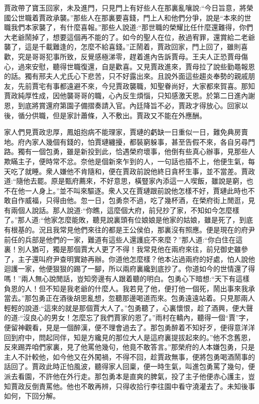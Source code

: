 \begin{parag}
    賈政帶了寶玉回家，未及進門，只見門上有好些人在那裏亂嚷說:“今日旨意，將榮國公世職着賈政承襲。”那些人在那裏要喜錢，門上人和他們分爭，說是“本來的世職我們本家襲了，有什麼喜報。”那些人說道:“那世職的榮耀比任什麼還難得，你們大老爺鬧掉了，想要這個再不能的了。如今的聖人在位，赦過宥罪，還賞給二老爺襲了，這是千載難逢的，怎麼不給喜錢。”正鬧着，賈政回家，門上回了，雖則喜歡，究是哥哥犯事所致，反覺感極涕零，趕着進內告訴賈母。王夫人正恐賈母傷心，過來安慰，聽得世職復還，自是歡喜。又見賈政進來，賈母拉了說些勤黽報恩的話。獨有邢夫人尤氏心下悲苦，只不好露出來。且說外面這些趨炎奉勢的親戚朋友，先前賈宅有事都遠避不來，今兒賈政襲職，知聖眷尚好，大家都來賀喜。那知賈政純厚性成，因他襲哥哥的職，心內反生煩惱，只知感激天恩。於第二日進內謝恩，到底將賞還府第園子備摺奏請入官。內廷降旨不必，賈政才得放心。回家以後，循分供職，但是家計蕭條，入不敷出。賈政又不能在外應酬。
\end{parag}


\begin{parag}
    家人們見賈政忠厚，鳳姐抱病不能理家，賈璉的虧缺一日重似一日，難免典房賣地。府內家人幾個有錢的，怕賈璉纏擾，都裝窮躲事，甚至告假不來，各自另尋門路。獨有一個包勇，雖是新投到此，恰遇榮府壞事，他倒有些真心辦事，見那些人欺瞞主子，便時常不忿。奈他是個新來乍到的人，一句話也插不上，他便生氣，每天吃了就睡。衆人嫌他不肯隨和，便在賈政前說他終日貪杯生事，並不當差。賈政道:“隨他去罷。原是甄府薦來，不好意思，橫豎家內添這一人喫飯，雖說是窮，也不在他一人身上。”並不叫來驅逐。衆人又在賈璉跟前說他怎樣不好，賈璉此時也不敢自作威福，只得由他。忽一日，包勇奈不過，吃了幾杯酒，在榮府街上閒逛，見有兩個人說話。那人說道:“你瞧，這麼個大府，前兒抄了家，不知如今怎麼樣了。”那人道:“他家怎麼能敗，聽見說裏頭有位娘娘是他家的姑娘，雖是死了，到底有根基的。況且我常見他們來往的都是王公侯伯，那裏沒有照應。便是現在的府尹前任的兵部是他們的一家，難道有這些人還護庇不來麼？”那人道:“你白住在這裏！別人猶可，獨是那個賈大人更了不得！我常見他在兩府來往，前兒御史雖參了，主子還叫府尹查明實跡再辦。你道他怎麼樣？他本沾過兩府的好處，怕人說他迴護一家，他便狠狠的踢了一腳，所以兩府裏纔到底抄了。你道如今的世情還了得嗎！”兩人無心說閒話，豈知旁邊有人跟着聽的明白。包勇心下暗想:“天下有這樣負恩的人！但不知是我老爺的什麼人。我若見了他，便打他一個死，鬧出事來我承當去。”那包勇正在酒後胡思亂想，忽聽那邊喝道而來。包勇遠遠站着。只見那兩人輕輕的說道:“這來的就是那個賈大人了。”包勇聽了，心裏懷恨，趁了酒興，便大聲的道:“沒良心的男女！怎麼忘了我們賈家的恩了。”雨村在轎內，聽得一個“賈”字，便留神觀看，見是一個醉漢，便不理會過去了。那包勇醉着不知好歹，便得意洋洋回到府中，問起同伴，知是方纔見的那位大人是這府裏提拔起來的。”他不念舊恩，反來踢弄咱們家裏，見了他罵他幾句，他竟不敢答言。”那榮府的人本嫌包勇，只是主人不計較他，如今他又在外闖禍，不得不回，趁賈政無事，便將包勇喝酒鬧事的話回了。賈政此時正怕風波，聽得家人回稟，便一時生氣，叫進包勇罵了幾句，便派去看園，不許他在外行走。那包勇本是直爽的脾氣，投了主子他便赤心護主，豈知賈政反倒責罵他。他也不敢再辨，只得收拾行李往園中看守澆灌去了。未知後事如何，下回分解。
\end{parag}